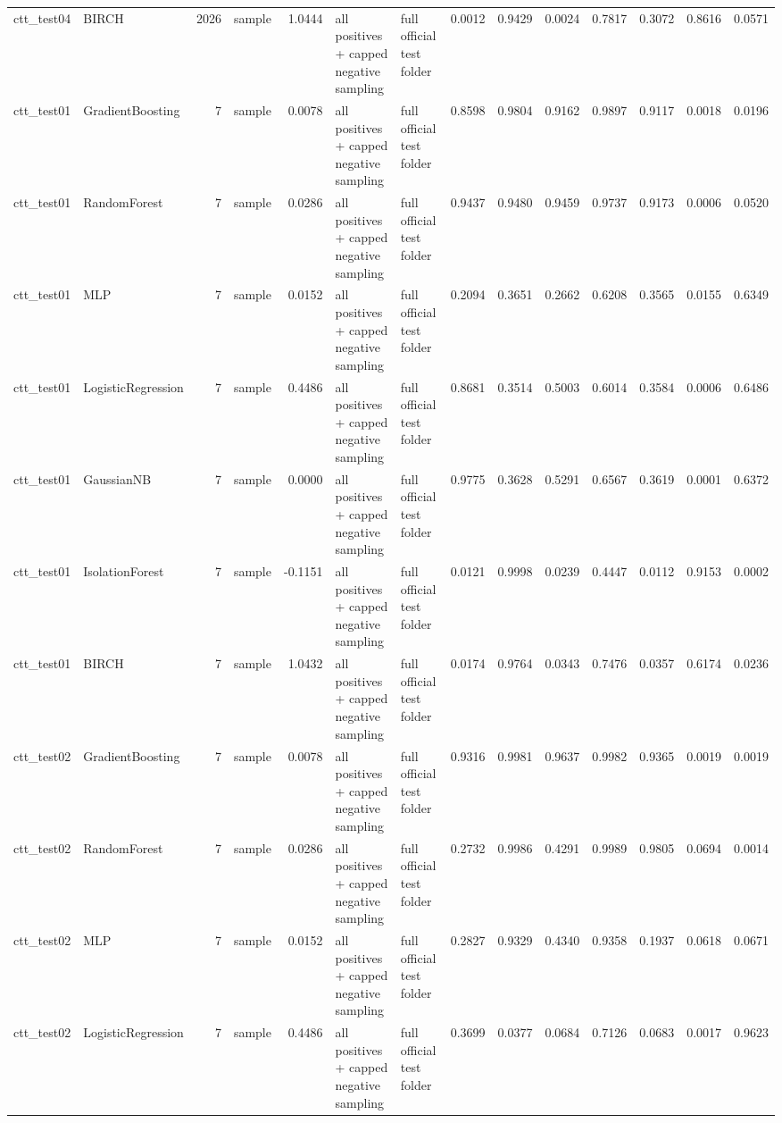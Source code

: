 \begin{tabular}{llrlrllrrrrrrr}
ctt\_test04 & BIRCH & 2026 & sample & 1.0444 & all positives + capped negative sampling & full official test folder & 0.0012 & 0.9429 & 0.0024 & 0.7817 & 0.3072 & 0.8616 & 0.0571 \\
ctt\_test01 & GradientBoosting & 7 & sample & 0.0078 & all positives + capped negative sampling & full official test folder & 0.8598 & 0.9804 & 0.9162 & 0.9897 & 0.9117 & 0.0018 & 0.0196 \\
ctt\_test01 & RandomForest & 7 & sample & 0.0286 & all positives + capped negative sampling & full official test folder & 0.9437 & 0.9480 & 0.9459 & 0.9737 & 0.9173 & 0.0006 & 0.0520 \\
ctt\_test01 & MLP & 7 & sample & 0.0152 & all positives + capped negative sampling & full official test folder & 0.2094 & 0.3651 & 0.2662 & 0.6208 & 0.3565 & 0.0155 & 0.6349 \\
ctt\_test01 & LogisticRegression & 7 & sample & 0.4486 & all positives + capped negative sampling & full official test folder & 0.8681 & 0.3514 & 0.5003 & 0.6014 & 0.3584 & 0.0006 & 0.6486 \\
ctt\_test01 & GaussianNB & 7 & sample & 0.0000 & all positives + capped negative sampling & full official test folder & 0.9775 & 0.3628 & 0.5291 & 0.6567 & 0.3619 & 0.0001 & 0.6372 \\
ctt\_test01 & IsolationForest & 7 & sample & -0.1151 & all positives + capped negative sampling & full official test folder & 0.0121 & 0.9998 & 0.0239 & 0.4447 & 0.0112 & 0.9153 & 0.0002 \\
ctt\_test01 & BIRCH & 7 & sample & 1.0432 & all positives + capped negative sampling & full official test folder & 0.0174 & 0.9764 & 0.0343 & 0.7476 & 0.0357 & 0.6174 & 0.0236 \\
ctt\_test02 & GradientBoosting & 7 & sample & 0.0078 & all positives + capped negative sampling & full official test folder & 0.9316 & 0.9981 & 0.9637 & 0.9982 & 0.9365 & 0.0019 & 0.0019 \\
ctt\_test02 & RandomForest & 7 & sample & 0.0286 & all positives + capped negative sampling & full official test folder & 0.2732 & 0.9986 & 0.4291 & 0.9989 & 0.9805 & 0.0694 & 0.0014 \\
ctt\_test02 & MLP & 7 & sample & 0.0152 & all positives + capped negative sampling & full official test folder & 0.2827 & 0.9329 & 0.4340 & 0.9358 & 0.1937 & 0.0618 & 0.0671 \\
ctt\_test02 & LogisticRegression & 7 & sample & 0.4486 & all positives + capped negative sampling & full official test folder & 0.3699 & 0.0377 & 0.0684 & 0.7126 & 0.0683 & 0.0017 & 0.9623 \\

\end{tabular}
